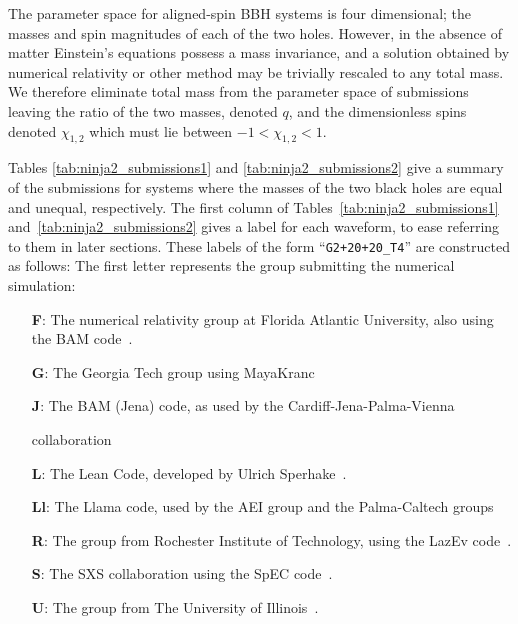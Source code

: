 The parameter space for aligned-spin BBH systems is four dimensional;
the masses and spin magnitudes of each of the two holes.  However, in
the absence of matter Einstein's equations possess a mass invariance,
and a solution obtained by numerical relativity or other method may be
trivially rescaled to any total mass.  We therefore eliminate total
mass from the parameter space of submissions leaving the ratio of the
two masses, denoted $q$, and the dimensionless spins denoted
$\chi_{1,2}$ which must lie between $-1 < \chi_{1,2} < 1$.

Tables
\ref{tab:ninja2_submissions1} and \ref{tab:ninja2_submissions2} give a
summary of the submissions for systems where the masses of the two
black holes are equal and unequal, respectively. The first column of 
Tables~\ref{tab:ninja2_submissions1}
and~\ref{tab:ninja2_submissions2} gives a label for each waveform, to
ease referring to them in later sections.  These labels of the
form ``{\tt G2+20+20\_T4}'' are constructed as follows: The first letter
represents the group submitting the numerical simulation:
\begin{itemize}
\item[{\bf F}:] The numerical relativity group at Florida Atlantic University, 
also using the BAM 
code~\cite{Tichy:2010qa,Brugmann:2008zz,Marronetti:2007ya,Bruegmann:2003aw}.
\item[{\bf G}:] The Georgia Tech group using 
MayaKranc~\cite{Healy:2008js,Healy:2009ir,Bode:2009mt,Herrmann:2007ex,
Healy:2009zm,Bode:2011tq,Hinder:2007qu}
\item[{\bf J}:] The BAM (Jena) code, as used by the Cardiff-Jena-Palma-Vienna
  
collaboration~\cite{Husa:2007hp,Hannam:2007wf,Ajith:2009bn,Hannam:2010ec,
Brugmann:2008zz,Hannam:2007ik}
\item[{\bf L}:] The Lean Code, developed by Ulrich 
Sperhake~\cite{Sperhake:2006cy,Sperhake:2007gu}.
\item[{\bf Ll}:] The Llama code, used by the AEI group and the Palma-Caltech 
groups~\cite{Pollney:2010hs,Reisswig:2009rx,Pollney:2009yz}
\item[{\bf R}:] The group from Rochester Institute of Technology, using the
  LazEv code~\cite{Campanelli:2005dd,Lousto:2010tb,Lousto:2010qx,Nakano:2011pb}.
\item[{\bf S}:] The SXS collaboration using the SpEC 
code~\cite{Pfeiffer:2002wt,Scheel:2006gg,Lovelace:2011nu,Szilagyi:2009qz,
Lovelace:2010ne,Scheel:2008rj,SpECWebsite,Boyle:2007ft,Lindblom:2005qh,
Boyle:2009vi}.
\item[{\bf U}:] The group from The University of Illinois~\cite{Etienne:2008re}.
\end{itemize}
